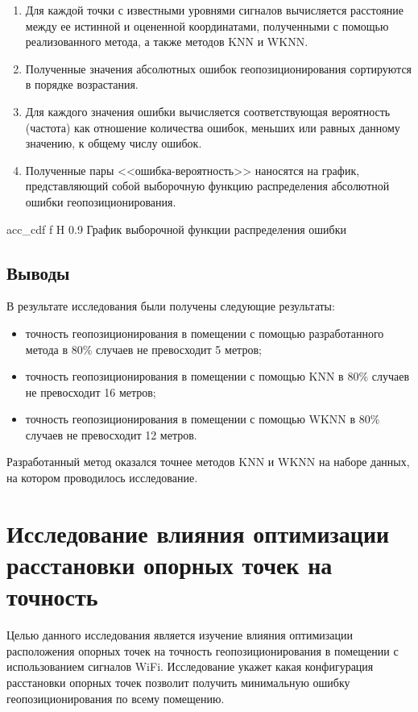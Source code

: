 \begin{enumerate}[left=0.49cm]
    \item Для каждой точки с известными уровнями сигналов вычисляется расстояние между ее истинной и оцененной координатами, полученными с помощью реализованного метода, а также методов KNN и WKNN.
    \item Полученные значения абсолютных ошибок геопозиционирования сортируются в порядке возрастания.
    \item Для каждого значения ошибки вычисляется соответствующая вероятность (частота) как отношение количества ошибок, меньших или равных данному значению, к общему числу ошибок.
    \item Полученные пары <<ошибка-вероятность>> наносятся на график, представляющий собой выборочную функцию распределения абсолютной ошибки геопозиционирования.
\end{enumerate}

    {acc_cdf}
    {f}
    {H}
    {0.9\linewidth}
    {График выборочной функции распределения ошибки}

\subsection{Выводы}

В результате исследования были получены следующие результаты:

\begin{itemize}[label=---,left=0.49cm]
    \item точность геопозиционирования в помещении с помощью разработанного метода в 80\% случаев не превосходит 5 метров;
    \item точность геопозиционирования в помещении с помощью KNN в 80\% случаев не превосходит 16 метров;
    \item точность геопозиционирования в помещении с помощью WKNN в 80\% случаев не превосходит 12 метров.
\end{itemize}

Разработанный метод оказался точнее методов KNN и WKNN на наборе данных, на котором проводилось исследование.

\clearpage

\section{Исследование влияния оптимизации расстановки опорных точек на точность}

Целью данного исследования является изучение влияния оптимизации расположения опорных точек на точность геопозиционирования в помещении с использованием сигналов WiFi. Исследование укажет какая конфигурация расстановки опорных точек позволит получить минимальную ошибку геопозиционирования по всему помещению.

